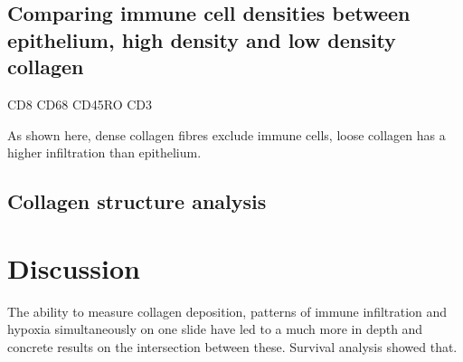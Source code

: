 \subsection{Comparing immune cell densities between epithelium, high density and low density collagen}

CD8
CD68
CD45RO
CD3

As shown here, dense collagen fibres exclude immune cells, loose collagen has a higher infiltration than epithelium.

\subsection{Collagen structure analysis}

\section{Discussion}
The ability to measure collagen deposition, patterns of immune infiltration and hypoxia simultaneously on one slide have led to a much more in depth and concrete results on the intersection between these.
Survival analysis showed that. 

